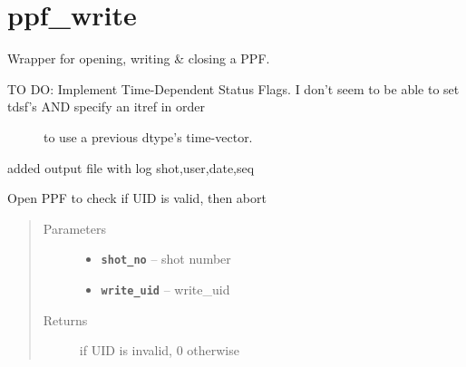 \documentclass[letterpaper,10pt,english]{sphinxmanual}
\begin{document}

\begin{fulllineitems}
\label{library:library.delete_files_in_folder}
\end{fulllineitems}



\section{ppf\_write}
\label{ppf_write:module-ppf_write}\label{ppf_write:ppf-write}\label{ppf_write::doc}
Wrapper for opening, writing \& closing a PPF.
\begin{description}
\item[{TO DO: Implement Time-Dependent Status Flags. I don't seem to be able to set tdsf's AND specify an itref in order}] \leavevmode
to use a previous dtype's time-vector.

\end{description}

added
output file with log
shot,user,date,seq

\begin{fulllineitems}
\label{ppf_write:ppf_write.check_uid}
Open PPF to check if UID is valid, then abort
\begin{quote}\begin{description}
\item[{Parameters}] \leavevmode\begin{itemize}
\item {} 
\textbf{\texttt{shot\_no}} -- shot number

\item {} 
\textbf{\texttt{write\_uid}} -- write\_uid

\end{itemize}

\item[{Returns}]  if UID is invalid, 0 otherwise

\end{description}\end{quote}

\end{fulllineitems}

\end{document}
